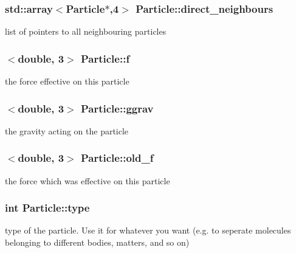 \subsubsection[{\texorpdfstring{direct\+\_\+neighbours}{direct_neighbours}}]{\setlength{\rightskip}{0pt plus 5cm}std\+::array$<${\bf Particle}$\ast$,4$>$ Particle\+::direct\+\_\+neighbours\hspace{0.3cm}{\ttfamily [private]}}\hypertarget{classParticle_a1f69cc0e44588388ceeb8a2d43d7f9ea}{}\label{classParticle_a1f69cc0e44588388ceeb8a2d43d7f9ea}
list of pointers to all neighbouring particles 
\subsubsection[{\texorpdfstring{f}{f}}]{$<$double, 3$>$ Particle\+::f\hspace{0.3cm}{\ttfamily [private]}}\hypertarget{classParticle_ad9aa3e171ea950b2cff1b4825e67845b}{}\label{classParticle_ad9aa3e171ea950b2cff1b4825e67845b}
the force effective on this particle 
\subsubsection[{\texorpdfstring{ggrav}{ggrav}}]{$<$double, 3$>$ Particle\+::ggrav\hspace{0.3cm}{\ttfamily [private]}}\hypertarget{classParticle_a8b248fe4a6231594ebb6c80ceb36338c}{}\label{classParticle_a8b248fe4a6231594ebb6c80ceb36338c}
the gravity acting on the particle 
\subsubsection[{\texorpdfstring{old\+\_\+f}{old_f}}]{$<$double, 3$>$ Particle\+::old\+\_\+f\hspace{0.3cm}{\ttfamily [private]}}\hypertarget{classParticle_ad9281e33474f23f7261f28848affc4a4}{}\label{classParticle_ad9281e33474f23f7261f28848affc4a4}
the force which was effective on this particle 
\subsubsection[{\texorpdfstring{type}{type}}]{\setlength{\rightskip}{0pt plus 5cm}int Particle\+::type\hspace{0.3cm}{\ttfamily [private]}}\hypertarget{classParticle_a2b73dd42bcd56ba2e7ffeb0a5515a866}{}\label{classParticle_a2b73dd42bcd56ba2e7ffeb0a5515a866}
type of the particle. Use it for whatever you want (e.\+g. to seperate molecules belonging to different bodies, matters, and so on) 
